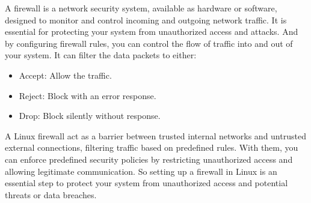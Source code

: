 
%
%
%

%
% 
A firewall is a network security system, available as hardware or software, designed to monitor and control 
incoming and outgoing network traffic. %
It is essential for protecting your system from unauthorized access and attacks. 
And by configuring firewall rules, you can control the flow of traffic into and out of your system. 
It can filter the data packets to either:
\begin{itemize}
    \item Accept: Allow the traffic.
    \item Reject: Block with an error response.
    \item Drop: Block silently without response. 
\end{itemize} 
A Linux firewall act as a barrier between trusted internal networks and untrusted external connections, filtering traffic based on predefined rules. 
With them, you can enforce predefined security policies by restricting unauthorized access and allowing legitimate communication. 
So setting up a firewall in Linux is an essential step to protect your system from unauthorized access and potential threats or data breaches. 
